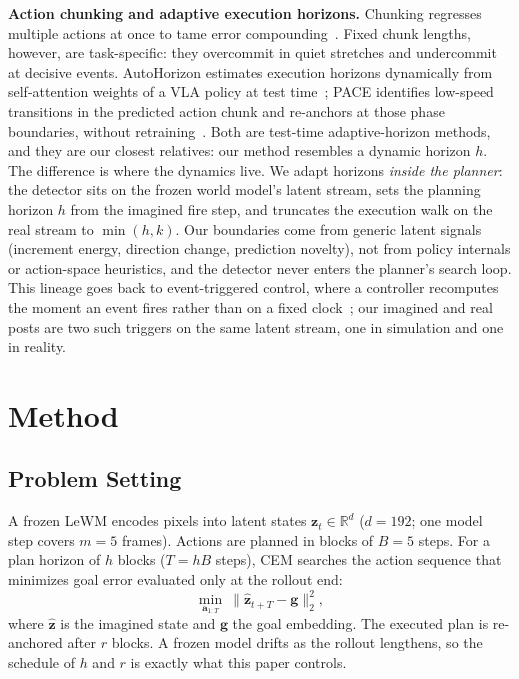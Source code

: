 \documentclass[conference]{IEEEtran}
\begin{document}
\textbf{Action chunking and adaptive execution horizons.} Chunking regresses multiple actions
at once to tame error compounding~\cite{act2023}. Fixed chunk lengths, however, are
task-specific: they overcommit in quiet stretches and undercommit at decisive events. AutoHorizon
estimates execution horizons dynamically from self-attention weights of a VLA policy at test
time~\cite{autohorizon2026}; PACE identifies low-speed transitions in the predicted action
chunk and re-anchors at those phase boundaries, without retraining~\cite{pace2026}. Both are
test-time adaptive-horizon methods, and they are our closest relatives: our method resembles a
dynamic horizon $h$. The difference is where the dynamics live. We adapt horizons \emph{inside the
planner}: the detector sits on the frozen world model's latent stream, sets the planning
horizon $h$ from the imagined fire step, and truncates the execution walk on the real stream to
$\min(h,k)$. Our boundaries come from generic latent signals (increment energy, direction
change, prediction novelty), not from policy internals or action-space heuristics, and the
detector never enters the planner's search loop. This lineage goes back to event-triggered
control, where a controller recomputes the moment an event fires rather than on a fixed
clock~\cite{heemels2012}; our imagined and real posts are two such triggers on the same latent
stream, one in simulation and one in reality.

\section{Method}

\subsection{Problem Setting}
A frozen LeWM encodes pixels into latent states $\mathbf{z}_t\in\mathbb{R}^d$ ($d=192$; one model step covers $m=5$ frames). Actions are planned in blocks of $B=5$ steps. For a plan horizon of $h$ blocks ($T=hB$ steps), CEM searches the action sequence that minimizes goal error evaluated only at the rollout end:
\begin{equation}
\min_{\mathbf{a}_{1:T}}\ \lVert \hat{\mathbf{z}}_{t+T}-\mathbf{g}\rVert_2^2 ,
\end{equation}
where $\hat{\mathbf{z}}$ is the imagined state and $\mathbf{g}$ the goal embedding. The executed plan is re-anchored after $r$ blocks. A frozen model drifts as the rollout lengthens, so the schedule of $h$ and $r$ is exactly what this paper controls.
\end{document}
